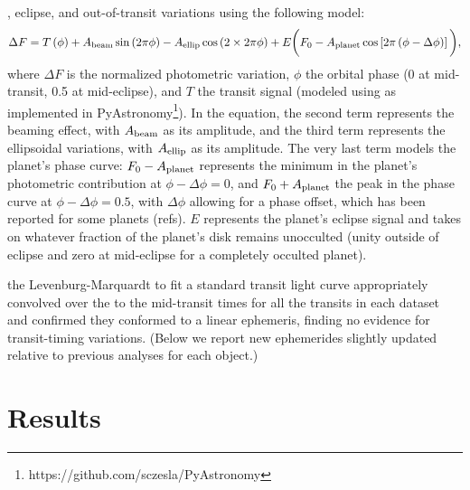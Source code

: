 \documentclass[manuscript]{aastex62}
\begin{document}
, eclipse, and out-of-transit variations using the following model:
\begin{equation}
    \Delta F = T\left(\phi\right) + A_{\rm beam} \sin\left(2\pi\phi\right) - A_{\rm ellip} \cos\left( 2 \times 2\pi\phi \right) + E \bigg( F_{\rm 0} - A_{\rm planet} \cos\left[ 2\pi\left( \phi - \Delta \phi \right) \right] \bigg), \label{eqn:photometric_model}
\end{equation}
where $\Delta F$ is the normalized photometric variation, $\phi$ the orbital phase (0 at mid-transit, 0.5 at mid-eclipse), and $T$ the transit signal (modeled using \citealt{2002ApJ...580L.171M} as implemented in PyAstronomy\footnote{https://github.com/sczesla/PyAstronomy}). In the equation, the second term represents the beaming effect, with $A_{\rm beam}$ as its amplitude, and the third term represents the ellipsoidal variations, with $A_{\rm ellip}$ as its amplitude. The very last term models the planet's phase curve: $F_{\rm 0} - A_{\rm planet}$ represents the minimum in the planet's photometric contribution at $\phi - \Delta \phi = 0$, and $F_{\rm 0} + A_{\rm planet}$ the peak in the phase curve at $\phi - \Delta \phi = 0.5$, with $\Delta \phi$ allowing for a phase offset, which has been reported for some planets (refs). $E$ represents the planet's eclipse signal and takes on whatever fraction of the planet's disk remains unocculted (unity outside of eclipse and zero at mid-eclipse for a completely occulted planet).

the Levenburg-Marquardt to fit a standard transit light curve \citep{2002ApJ...580L.171M} appropriately convolved over the to the mid-transit times for all the transits in each dataset and confirmed they conformed to a linear ephemeris, finding no evidence for transit-timing variations. (Below we report new ephemerides slightly updated relative to previous analyses for each object.) 

\section{Results}
\end{document}
